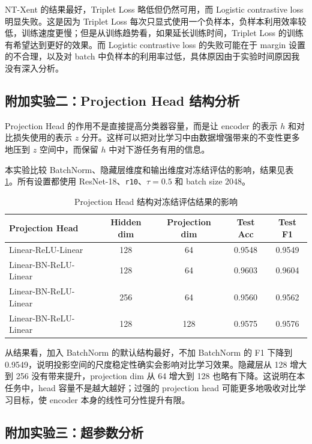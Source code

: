 \documentclass{ctexart}
\begin{document}
NT-Xent 的结果最好，Triplet Loss 略低但仍然可用，而 Logistic contrastive loss 明显失败。这是因为 Triplet Loss 每次只显式使用一个负样本，负样本利用效率较低，训练速度更慢；但是从训练趋势看，如果延长训练时间，Triplet Loss 的训练有希望达到更好的效果。而 Logistic contrastive loss 的失败可能在于 margin 设置的不合理，以及对 batch 中负样本的利用率过低，具体原因由于实验时间原因我没有深入分析。
\FloatBarrier

\subsection{附加实验二：Projection Head 结构分析}

Projection Head 的作用不是直接提高分类器容量，而是让 encoder 的表示 $h$ 和对比损失使用的表示 $z$ 分开。这样可以把对比学习中由数据增强带来的不变性更多地压到 $z$ 空间中，而保留 $h$ 中对下游任务有用的信息。

本实验比较 BatchNorm、隐藏层维度和输出维度对冻结评估的影响，结果见表 \ref{tab:head-results}。所有设置都使用 ResNet-18、\verb|r10|、$\tau=0.5$ 和 batch size 2048。

\begin{table}[H]
    \centering
    \begin{tabular}{lcccc}
        \toprule
        Projection Head & Hidden dim & Projection dim & Test Acc & Test F1 \\
        \midrule
        Linear-ReLU-Linear & 128 & 64 & 0.9548 & 0.9549 \\
        Linear-BN-ReLU-Linear & 128 & 64 & 0.9603 & 0.9604 \\
        Linear-BN-ReLU-Linear & 256 & 64 & 0.9560 & 0.9562 \\
        Linear-BN-ReLU-Linear & 128 & 128 & 0.9575 & 0.9576 \\
        \bottomrule
    \end{tabular}
    \caption{Projection Head 结构对冻结评估结果的影响}
    \label{tab:head-results}
\end{table}

从结果看，加入 BatchNorm 的默认结构最好，不加 BatchNorm 的 F1 下降到 0.9549，说明投影空间的尺度稳定性确实会影响对比学习效果。隐藏层从 128 增大到 256 没有带来提升，projection dim 从 64 增大到 128 也略有下降。这说明在本任务中，head 容量不是越大越好；过强的 projection head 可能更多地吸收对比学习目标，使 encoder 本身的线性可分性提升有限。

\subsection{附加实验三：超参数分析}
\end{document}
